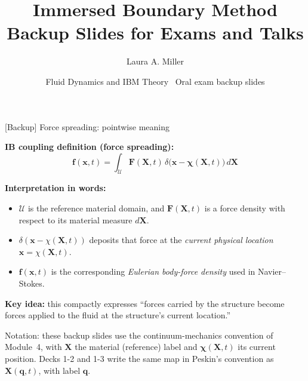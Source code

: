 \documentclass[aspectratio=169,11pt]{beamer}
\title[IBM backup]{Immersed Boundary Method Backup Slides for Exams and Talks}
\author{Laura A. Miller}
\institute{Department of Mathematics, University of Arizona}
\date{Fluid Dynamics and IBM Theory \textbullet\ Oral exam backup slides}
\begin{document}
\begin{frame}[plain]
\maketutorialtitle
\end{frame}


\begin{frame}{[Backup] Force spreading: pointwise meaning}
\small

\textbf{IB coupling definition (force spreading):}
\[
\boxed{
\mathbf{f}(\mathbf{x},t)
=
\int_{\mathcal U}
\mathbf{F}(\mathbf{X},t)\,
\delta\!\big(\mathbf{x}-\boldsymbol{\chi}(\mathbf{X},t)\big)\,d\mathbf{X}
}
\]

\medskip
\textbf{Interpretation in words:}
\begin{itemize}\itemsep3pt
\item $\mathcal U$ is the reference material domain, and $\mathbf{F}(\mathbf{X},t)$ is a force density with respect to its material measure $d\mathbf X$.
\item $\delta(\mathbf{x}-\chi(\mathbf{X},t))$ deposits that force at the \emph{current physical location}
      $\mathbf{x}=\chi(\mathbf{X},t)$.
\item $\mathbf{f}(\mathbf{x},t)$ is the corresponding \emph{Eulerian body-force density} used in Navier--Stokes.
\end{itemize}

\medskip
\textbf{Key idea:} this compactly expresses ``forces carried by the structure become forces applied to the fluid
at the structure's current location.''

\medskip
{\scriptsize\color{DarkGray}Notation: these backup slides use the continuum-mechanics convention of Module~4, with $\mathbf X$ the material (reference) label and $\boldsymbol\chi(\mathbf X,t)$ its current position. Decks 1-2 and 1-3 write the same map in Peskin's convention as $\mathbf X(\mathbf q,t)$, with label $\mathbf q$.\par}

\end{frame}
\end{document}
